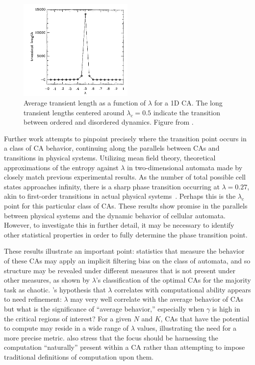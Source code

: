 \documentclass[a4paper,11pt]{article}
\begin{document}
\begin{figure}[htp]
\centering
\includegraphics[width=0.5\textwidth]{la90_fig3_lambda_transient_len.png}
\caption[Lambda and Transient Length]{
Average transient length as a function of $\lambda$ for a 1D CA. The long transient lengths centered around $\lambda_c=0.5$ indicate the transition between ordered and disordered dynamics. Figure from \citeauthor{la90} \cite{la90}.
}
\label{fig:lambda_trans}
\end{figure}

Further work attempts to pinpoint precisely where the transition point occurs in a class of CA behavior, continuing along the parallels between CAs and transitions in physical systems. Utilizing mean field theory, theoretical approximations of the entropy against $\lambda$ in two-dimensional automata made by \citeauthor{wo90} closely match previous experimental results. As the number of total possible cell states approaches infinity, there is a sharp phase transition occurring at $\lambda=0.27$, akin to first-order transitions in actual physical systems~\cite{wo90}. Perhaps this is the $\lambda_c$ point for this particular class of CAs. These results show promise in the parallels between physical systems and the dynamic behavior of cellular automata. However, to investigate this in further detail, it may be necessary to identify other statistical properties in order to fully determine the phase transition point.

These results illustrate an important point: statistics that measure the behavior of these CAs may apply an implicit filtering bias on the class of automata, and so structure may be revealed under different measures that is not present under other measures, as shown by $\lambda$'s classification of the optimal CAs for the majority task as chaotic. \citeauthor{la90}'s hypothesis that $\lambda$ correlates with computational ability appears to need refinement: $\lambda$ may very well correlate with the average behavior of CAs but what is the significance of  ``average behavior,''  especially when $\gamma$ is high in the critical regions of interest? For a given $N$ and $K$, CAs that have the potential to compute may reside in a wide range of $\lambda$ values, illustrating the need for a more precise metric. \citeauthor{mi93} also stress that the focus should be harnessing the computation ``naturally'' present within a CA rather than attempting to impose traditional definitions of computation upon them. 
\end{document}
